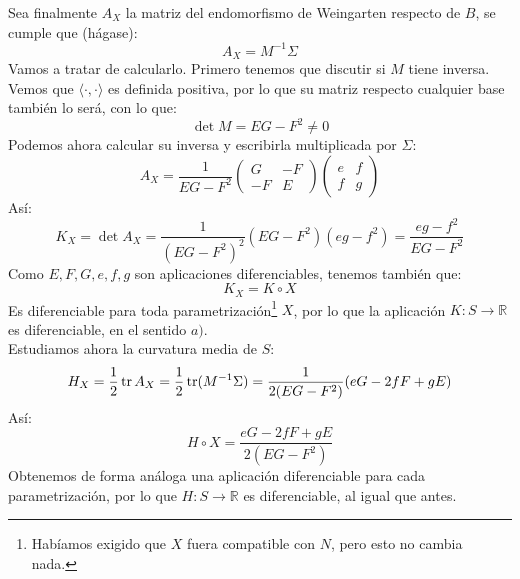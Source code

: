 \noindent
Sea finalmente $A_X$ la matriz del endomorfismo de Weingarten respecto de $B$, se cumple que (hágase):
\begin{equation*}
    A_X = M^{-1}\Sigma
\end{equation*}
Vamos a tratar de calcularlo. Primero tenemos que discutir si $M$ tiene inversa. Vemos que $\langle \cdot ,\cdot  \rangle $ es definida positiva, por lo que su matriz respecto cualquier base también lo será, con lo que:
\begin{equation*}
    \det M = EG-F^2 \neq 0
\end{equation*}
Podemos ahora calcular su inversa y escribirla multiplicada por $\Sigma$:
\begin{equation*}
    A_X = \frac{1}{EG-F^2}\left(\begin{array}{cc}
        G & -F \\
        -F & E 
    \end{array}\right)\left(\begin{array}{cc}
        e & f \\
        f & g 
    \end{array}\right)
\end{equation*}
Así:
\begin{equation*}
    K_X = \det A_X = \frac{1}{{(EG-F^2)}^{2}}(EG-F^2)(eg-f^2) = \frac{eg-f^2}{EG-F^2}
\end{equation*}
Como $E,F,G,e,f,g$ son aplicaciones diferenciables, tenemos también que:
\begin{equation*}
    K_X = K\circ X
\end{equation*}
Es diferenciable para toda parametrización\footnote{Habíamos exigido que $X$ fuera compatible con $N$, pero esto no cambia nada.} $X$, por lo que la aplicación $K:S\to\mathbb{R}$ es diferenciable, en el sentido $a)$.\\

\noindent
Estudiamos ahora la curvatura media de $S$:
\begin{equation*}
    H_X = \frac{1}{2}\operatorname{tr} A_X = \frac{1}{2} \operatorname{tr}(M^{-1}\Sigma) = \frac{1}{2(EG-F^2)}(eG-2fF + gE)
\end{equation*}
Así:
\begin{equation*}
    H\circ X = \frac{eG - 2fF + gE}{2(EG-F^2)}
\end{equation*}
Obtenemos de forma análoga una aplicación diferenciable para cada parametrización, por lo que $H:S\to\mathbb{R}$ es diferenciable, al igual que antes.\\

